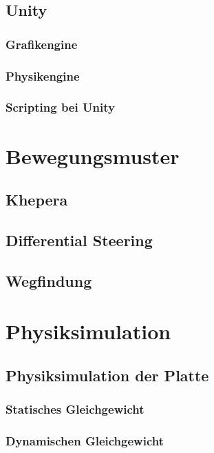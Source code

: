 \documentclass[ngerman]{scrartcl}
\begin{document}
\subsection{Unity}
\subsubsection{Grafikengine}
\subsubsection{Physikengine}
\subsubsection{Scripting bei Unity}
\section{Bewegungsmuster}
\subsection{Khepera}\label{khepera}
\subsection{Differential Steering}\label{diffs}
\subsection{Wegfindung}
\section{Physiksimulation}
\subsection{Physiksimulation der Platte}
\subsubsection{Statisches Gleichgewicht}
\subsubsection{Dynamischen Gleichgewicht}
\end{document}
